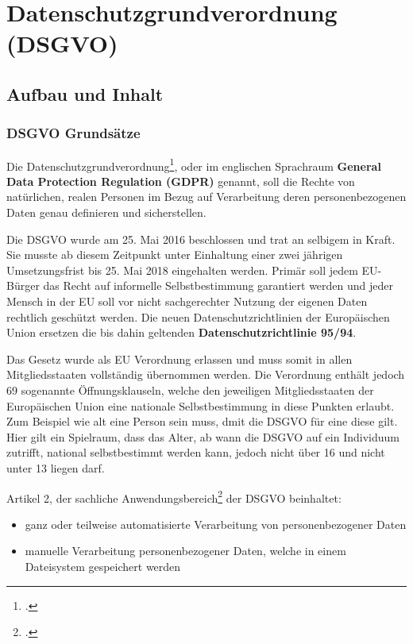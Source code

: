 \chapter{Datenschutzgrundverordnung (DSGVO)}
\putz

\section{Aufbau und Inhalt}
\subsection{DSGVO Grundsätze}
Die Datenschutzgrundverordnung\footcite{dsgvo-wiki}, oder im englischen Sprachraum \textbf{General Data Protection Regulation (GDPR)} genannt, soll die Rechte von natürlichen, realen Personen im Bezug auf Verarbeitung deren personenbezogenen Daten genau definieren und sicherstellen.

Die DSGVO wurde am 25. Mai 2016 beschlossen und trat an selbigem in Kraft. Sie musste ab diesem Zeitpunkt unter Einhaltung einer zwei jährigen Umsetzungsfrist bis 25. Mai 2018 eingehalten werden. Primär soll jedem EU-Bürger das Recht auf informelle Selbstbestimmung garantiert werden und jeder Mensch in der EU soll vor nicht sachgerechter Nutzung der eigenen Daten rechtlich geschützt werden.
Die neuen Datenschutzrichtlinien der Europäischen Union ersetzen die bis dahin geltenden \textbf{Datenschutzrichtlinie 95/94}.

Das Gesetz wurde als EU Verordnung erlassen und muss somit in allen Mitgliedsstaaten vollständig übernommen werden. Die Verordnung enthält jedoch 69 sogenannte Öffnungsklauseln, welche den jeweiligen Mitgliedsstaaten der Europäischen Union eine nationale Selbstbestimmung in diese Punkten erlaubt.
Zum Beispiel wie alt eine Person sein muss, dmit die DSGVO für eine diese gilt. Hier gilt ein Spielraum, dass das Alter, ab wann die DSGVO auf ein Individuum zutrifft, national selbstbestimmt werden kann, jedoch nicht über 16 und nicht unter 13 liegen darf.

Artikel 2, der sachliche Anwendungsbereich\footcite{Lehrunterlagen-HTL-cloud} der DSGVO beinhaltet:
\begin{itemize}
	\item ganz oder teilweise automatisierte Verarbeitung von personenbezogener Daten
	\item manuelle Verarbeitung personenbezogener Daten, welche in einem Dateisystem gespeichert werden
\end{itemize}

